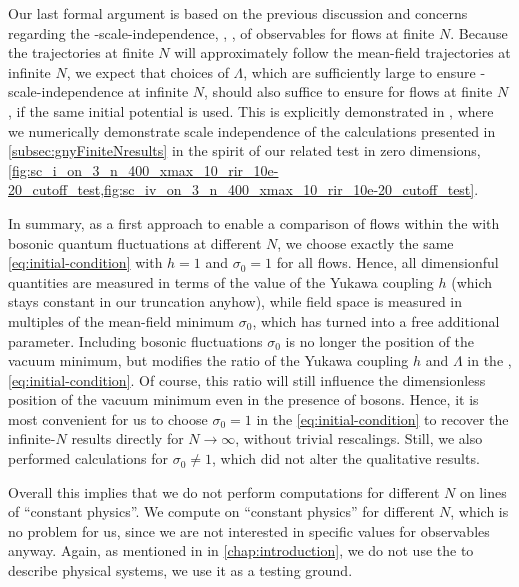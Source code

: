 Our last formal argument is based on the previous discussion and concerns regarding the \uv{}-scale-independence, \ie{}, \rgcy{}, of \ir{} observables for \frg{} flows at finite $N$. 
Because the \frg{} trajectories at finite $N$ will approximately follow the mean-field \frg{} trajectories at infinite $N$, we expect that choices of $\Lambda$, which are sufficiently large to ensure \uv{}-scale-independence at infinite $N$, should also suffice to ensure \rgcy{} for \frg{} flows at finite $N$, if the same \uv{} initial potential is used.
This is explicitly demonstrated in \gnAppNumRGC, where we numerically demonstrate \uv{} scale independence of the calculations presented in \cref{subsec:gnyFiniteNresults} in the spirit of our related test in zero dimensions, \cf{} \cref{fig:sc_i_on_3_n_400_xmax_10_rir_10e-20_cutoff_test,fig:sc_iv_on_3_n_400_xmax_10_rir_10e-20_cutoff_test}.\bigskip

In summary, as a first approach to enable a comparison of \frg{} flows within the \gny{} with bosonic quantum fluctuations at different $N$, we choose exactly the same \uv{} \ic{} \eqref{eq:initial-condition} with $h = 1$ and $\sigma_0 = 1$ for all \frg{} flows.
Hence, all dimensionful quantities are measured in terms of the \uv{} value of the Yukawa coupling $h$ (which stays constant in our truncation anyhow), while field space is measured in multiples of the mean-field minimum $\sigma_0$, which has turned into a free additional parameter.
Including bosonic fluctuations $\sigma_0$ is no longer the position of the vacuum \ir{} minimum, but modifies the ratio of the Yukawa coupling $h$ and $\Lambda$ in the \uv{}, \cf{} \cref{eq:initial-condition}.
Of course, this ratio will still influence the dimensionless position of the vacuum \ir{} minimum even in the presence of bosons.
Hence, it is most convenient for us to choose $\sigma_0 = 1$ in the \ic{} \eqref{eq:initial-condition} to recover the infinite-$N$ results directly for $N \rightarrow \infty$, without trivial rescalings. Still, we also performed calculations for $\sigma_0 \neq 1$, which did not alter the qualitative results.

Overall this implies that we do not perform computations for different $N$ on lines of ``constant \ir{} physics''.
We compute on ``constant \uv{} physics'' for different $N$, which is no problem for us, since we are not interested in specific values for \ir{} observables anyway.
Again, as mentioned in  in \cref{chap:introduction}, we do not use the \gnyBm{} to describe physical systems, we use it as a testing ground.

